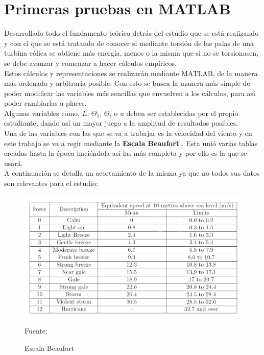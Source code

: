 \section{Primeras pruebas en MATLAB}

Desarrollado todo el fundamento teórico detrás del estudio que se está realizando y con el que se está tratando de conocer si mediante torsión de las palas de una turbina eólica se obtiene más energía, menos o la misma que si no se torsionasen, se debe avanzar y comenzar a hacer cálculos empíricos. \\

Estos cálculos y representaciones se realizarán mediante MATLAB, de la manera más ordenada y arbitraria posible. Con esto se busca la manera más simple de poder modificar las variables más sencillas que envuelven a los cálculos, para así poder cambiarlas a placer. \\

Algunas variables como, $L$, $\Theta_1$, $\Theta_i$  o $u$ deben ser establecidas por el propio estudiante, dando así un mayor juego a la amplitud de resultados posibles. \\

Una de las variables con las que se va a trabajar es la velocidad del viento y en este trabajo se va a regir mediante la \textbf{Escala Beaufort} \cite{BeaufortScale2012}. Esta unió varias tablas creadas hasta la época haciéndola así las más completa y por ello es la que se usará.\\

A continuación se detalla un acortamiento de la misma ya que no todos sus datos son relevantes para el estudio:

\begin{figure}[H]
    \centering
    \includegraphics[width=1\textwidth]{images/Tabla Beaufort Efect.png}
    \caption{Escala Beaufort}
     Fuente: \cite{BeaufortScale2012}
     \label{tabla:escala_beaufort}
\end{figure}

